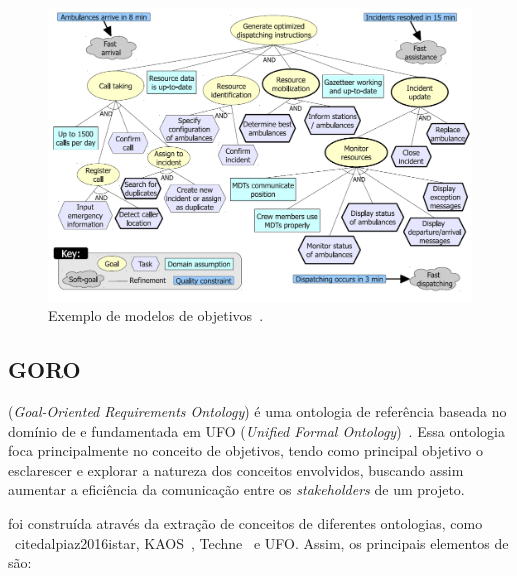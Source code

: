 \begin{figure}
	\centering
	\includegraphics[width=1\textwidth]{figuras/modelos/ACAD-Simples.png}
	\caption{Exemplo de modelos de objetivos~\cite{tesevitor}.}
	\label{figura-acad-simples}
\end{figure}

\subsection{GORO}
\label{sec-referencia-engenharia-objetivos-goro}
\goro (\textit{Goal-Oriented Requirements Ontology}) é uma ontologia de referência baseada no domínio de \gore e fundamentada em UFO (\textit{Unified Formal Ontology})~\cite{guizzardi2005ontological}. Essa ontologia foca principalmente no conceito de objetivos, tendo como principal objetivo o esclarescer e explorar a natureza dos conceitos envolvidos, buscando assim aumentar a eficiência da comunicação entre os \textit{stakeholders} de um projeto. 

\goro foi construída através da extração de conceitos de diferentes ontologias, como \istar~cite{dalpiaz2016istar}, KAOS~\cite{dardenne1993goal}, Techne~\cite{borgida2009techne} e UFO. Assim, os principais elementos de \goro são:

